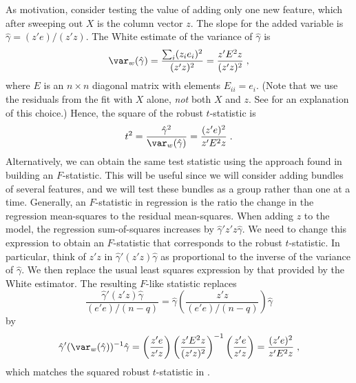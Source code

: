 \documentclass[12pt]{article}
\begin{document}
 As motivation, consider testing the value of adding only one new feature, which
 after sweeping out $X$ is the column vector $z$.  The slope for the added
 variable is $\hat\gamma = (z'e)/(z'z)$.  The White estimate of the variance of
 $\hat\gamma$ is
\begin{displaymath}
  \var_w(\hat\gamma) = \frac{\sum_i (z_ie_i)^2} {(z'z)^2} 
   = \frac{z'E^2z} {(z'z)^2} \;,
\end{displaymath}
 where $E$ is an $n \times n$ diagonal matrix with elements $E_{ii}=e_i$.  (Note
 that we use the residuals from the fit with $X$ alone, {\em not} both $X$ and
 $z$. See \citet{fosterstine04:bank} for an explanation of this choice.)  Hence, the
 square of the robust $t$-statistic is
\begin{equation}
  t^2 = \frac{\hat\gamma^2}{\var_w(\hat\gamma)} 
      = \frac{(z'e)^2}{z'E^2z} \;.
\label{eq:t2}
\end{equation}
 Alternatively, we can obtain the same test statistic using the approach found
 in building an $F$-statistic.  This will be useful since we will consider
 adding bundles of several features, and we will test these bundles as a group
 rather than one at a time.  Generally, an $F$-statistic in regression is the
 ratio the change in the regression mean-squares to the residual mean-squares.
  When adding $z$ to the model, the regression sum-of-squares increases by
 $\hat\gamma' z'z \hat\gamma$.  We need to change this expression to obtain an
 $F$-statistic that corresponds to the robust $t$-statistic.  In particular,
 think of $z'z$ in $\hat\gamma' (z'z) \hat\gamma$ as proportional to the inverse
 of the variance of $\hat\gamma$.  We then replace the usual least squares
 expression by that provided by the White estimator.  The resulting $F$-like
 statistic replaces
\begin{equation}
  \frac{\hat\gamma' (z'z) \hat\gamma}{(e'e)/(n-q)}=
  \hat\gamma\left(\frac{z'z}{(e'e)/(n-q)}\right) \hat\gamma 
\end{equation}
by
\begin{equation}
  \hat\gamma' (\var_w(\hat\gamma))^{-1} \hat\gamma = 
  \left(\frac{z'e}{z'z}\right) \left(\frac{z'E^2z}{(z'z)^2}\right)^{-1}
  \left(\frac{z'e}{z'z}\right) = \frac{(z'e)^2}{z'E^2z} \;,
\label{eq:F2}
\end{equation}
 which matches the squared robust $t$-statistic in .
\end{document}
